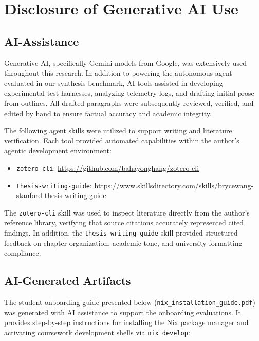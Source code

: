 \chapter{Disclosure of Generative AI Use}\label{apd:a}

\section{AI-Assistance}

Generative AI, specifically Gemini models from Google, was extensively used throughout this research. In addition to powering the autonomous agent evaluated in our synthesis benchmark, AI tools assisted in developing experimental test harnesses, analyzing telemetry logs, and drafting initial prose from outlines. All drafted paragraphs were subsequently reviewed, verified, and edited by hand to ensure factual accuracy and academic integrity.

The following agent skills were utilized to support writing and literature verification. Each tool provided automated capabilities within the author's agentic development environment:
\begin{itemize}
	\item \texttt{zotero-cli}: \url{https://github.com/bahayonghang/zotero-cli}
	\item \texttt{thesis-writing-guide}: \url{https://www.skillsdirectory.com/skills/brycewang-stanford-thesis-writing-guide}
\end{itemize}

The \texttt{zotero-cli} skill was used to inspect literature directly from the author's reference library, verifying that source citations accurately represented cited findings. In addition, the \texttt{thesis-writing-guide} skill provided structured feedback on chapter organization, academic tone, and university formatting compliance.

\section{AI-Generated Artifacts}

The student onboarding guide presented below (\texttt{nix\_installation\_guide.pdf}) was generated with AI assistance to support the onboarding evaluations. It provides step-by-step instructions for installing the Nix package manager and activating coursework development shells via \texttt{nix develop}:



